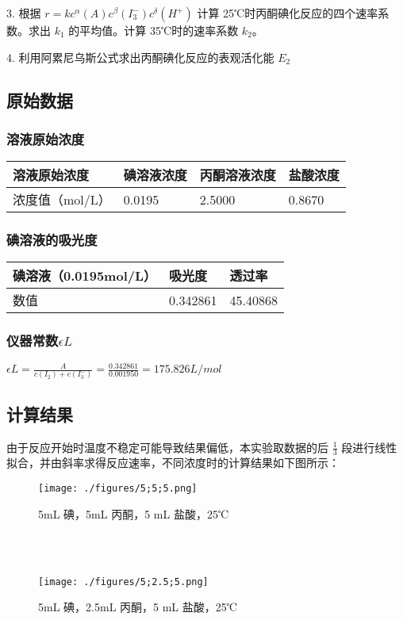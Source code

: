 \documentclass[4pt,a4papper]{article}
\begin{document}
3. 根据 $r = kc^\alpha(A)c^\beta(I_3^-)c^\delta(H^+)$ 计算 25℃时丙酮碘化反应的四个速率系数。求出 $k_1$ 的平均值。计算 35℃时的速率系数 $k_2$。

4. 利用阿累尼乌斯公式求出丙酮碘化反应的表观活化能 $E_2$


\subsection{原始数据}
\subsubsection{溶液原始浓度}
\begin{table}[htbp]
\begin{tabular}{|l|l|l|l|}
\hline
溶液原始浓度     & 碘溶液浓度  & 丙酮溶液浓度 & 盐酸浓度   \\ \hline
浓度值（mol/L） & 0.0195 & 2.5000 & 0.8670 \\ \hline
\end{tabular}
\end{table}
\subsubsection{碘溶液的吸光度}
\begin{table}[htbp]
\begin{tabular}{|l|l|l|}
\hline
碘溶液（0.0195mol/L） & 吸光度      & 透过率      \\ \hline
数值               & 0.342861 & 45.40868 \\ \hline
\end{tabular}
\end{table}
\subsubsection{仪器常数$\epsilon L$}
$\epsilon L = \frac{A}{c(I_2)+c(I_3^-)} = \frac{0.342861}{0.001950} = 175.826 L/mol$


\subsection{计算结果}
由于反应开始时温度不稳定可能导致结果偏低，本实验取数据的后 $\frac{1}{3}$ 段进行线性拟合，并由斜率求得反应速率，不同浓度时的计算结果如下图所示：

    \begin{figure}[htb]
        \centering
        \texttt{[image: ./figures/5;5;5.png]}
        \caption{5mL 碘，5mL 丙酮，5 mL 盐酸，25℃} \label{fig: 1}
    \end{figure}
~\\
~\\
    \begin{figure}[hb]
        \centering
        \texttt{[image: ./figures/5;2.5;5.png]}
        \caption{5mL 碘，2.5mL 丙酮，5 mL 盐酸，25℃} \label{fig: 2}
    \end{figure}
\end{document}
